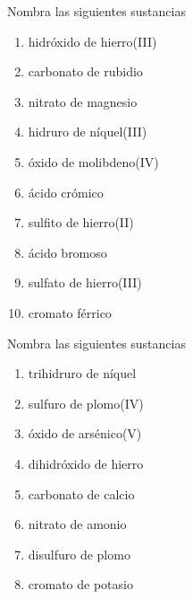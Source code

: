 \begin{exercise}[
    tags    = {inorgánica,formulación,múltiple,2B},
    topics  = {química inorgánica,formulación,nomenclatura},
    source  = {Química 2B SAN 2016, p372, e18},
  ]
  Nombra las siguientes sustancias

  \begin{enumerate}
    \item hidróxido de hierro(III)
    \item carbonato de rubidio
    \item nitrato de magnesio
    \item hidruro de níquel(III)
    \item óxido de molibdeno(IV)
    \item ácido crómico
    \item sulfito de hierro(II)
    \item ácido bromoso
    \item sulfato de hierro(III)
    \item cromato férrico
  \end{enumerate}
\end{exercise}

\begin{solution}
  \begin{enumerate}\begin{multicols}{2}
    \item {}
    \item {}
    \item {}
    \item {}
    \item {}
    \item {}
    \item {}
    \item {}
    \item {}
    \item {}
  \end{multicols}\end{enumerate}
\end{solution}




\begin{exercise}[
    tags    = {inorgánica,formulación,múltiple,2B},
    topics  = {química inorgánica,formulación,nomenclatura},
    source  = {Química 2B SAN 2016, p372, e19},
  ]
  Nombra las siguientes sustancias

  \begin{enumerate}
    \item trihidruro de níquel
    \item sulfuro de plomo(IV)
    \item óxido de arsénico(V)
    \item dihidróxido de hierro
    \item carbonato de calcio
    \item nitrato de amonio
    \item disulfuro de plomo
    \item cromato de potasio
  \end{enumerate}
\end{exercise}

